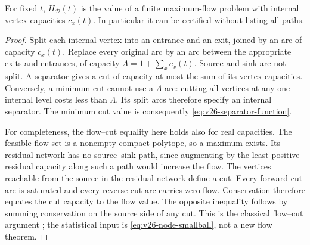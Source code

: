 \begin{proposition}\label{prop:v26-flow}
For fixed $t$, $H_{\mathscr D}(t)$ is the value of a finite
maximum-flow problem with internal vertex capacities $c_x(t)$.
In particular it can be certified without listing all paths.
\end{proposition}
\begin{proof}
Split each internal vertex into an entrance and an exit, joined by an
arc of capacity $c_x(t)$. Replace every original arc by an arc between
the appropriate exits and entrances, of capacity
$\Lambda=1+\sum_xc_x(t)$. Source and sink are not split.
A separator gives a cut of capacity at most the sum of its vertex
capacities. Conversely, a minimum cut cannot use a $\Lambda$-arc:
cutting all vertices at any one internal level costs less than
$\Lambda$. Its split arcs therefore specify an internal separator.
The minimum cut value is consequently \eqref{eq:v26-separator-function}.

For completeness, the flow--cut equality here holds also for real
capacities. The feasible flow set is a nonempty compact polytope, so a
maximum exists. Its residual network has no source--sink path, since
augmenting by the least positive residual capacity along such a path
would increase the flow. The vertices reachable from the source in the
residual network define a cut. Every forward cut arc is saturated and
every reverse cut arc carries zero flow. Conservation therefore equates
the cut capacity to the flow value. The opposite inequality follows by
summing conservation on the source side of any cut. This is the
classical flow--cut argument \cite{FordFulkerson1956}; the statistical
input is \eqref{eq:v26-node-smallball}, not a new flow theorem.
\end{proof}
